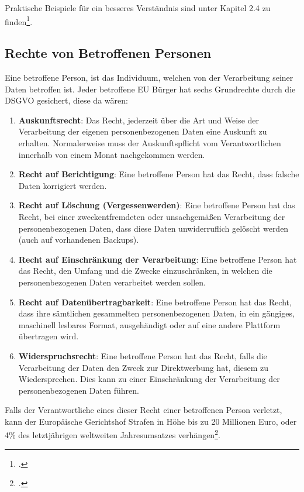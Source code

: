 Praktische Beispiele für ein besseres Verständnis sind unter Kapitel 2.4 zu finden\footcite{Lehrunterlagen-HTL-cloud}.

\subsection{Rechte von Betroffenen Personen}
Eine betroffene Person, ist das Individuum, welchen von der Verarbeitung seiner Daten betroffen ist.
Jeder betroffene EU Bürger hat sechs Grundrechte durch die DSGVO gesichert, diese da wären:

\begin{enumerate}
    \item \textbf{Auskunftsrecht}: Das Recht, jederzeit über die Art und Weise der Verarbeitung der eigenen personenbezogenen Daten eine Auskunft zu erhalten. Normalerweise muss der Auskunftspflicht vom Verantwortlichen innerhalb von einem Monat nachgekommen werden.
    \item \textbf{Recht auf Berichtigung}: Eine betroffene Person hat das Recht, dass falsche Daten korrigiert werden.
    \item \textbf{Recht auf Löschung (Vergessenwerden)}: Eine betroffene Person hat das Recht, bei einer zweckentfremdeten oder unsachgemäßen Verarbeitung der personenbezogenen Daten, dass diese Daten unwiderruflich gelöscht werden (auch auf vorhandenen Backups).
    \item \textbf{Recht auf Einschränkung der Verarbeitung}: Eine betroffene Person hat das Recht, den Umfang und die Zwecke einzuschränken, in welchen die personenbezogenen Daten verarbeitet werden sollen.
    \item \textbf{Recht auf Datenübertragbarkeit}: Eine betroffene Person hat das Recht, dass ihre sämtlichen gesammelten personenbezogenen Daten, in ein gängiges, maschinell lesbares Format, ausgehändigt oder auf eine andere Plattform übertragen wird.
    \item \textbf{Widerspruchsrecht}: Eine betroffene Person hat das Recht, falls die Verarbeitung der Daten den Zweck zur Direktwerbung hat, diesem zu Wiedersprechen. Dies kann zu einer Einschränkung der Verarbeitung der personenbezogenen Daten führen.
\end{enumerate}
    
Falls der Verantwortliche eines dieser Recht einer betroffenen Person verletzt, kann der Europäische Gerichtshof Strafen in Höhe bis zu 20 Millionen Euro, oder 4\% des letztjährigen weltweiten Jahresumsatzes verhängen\footcite{Lehrunterlagen-HTL-cloud}.

